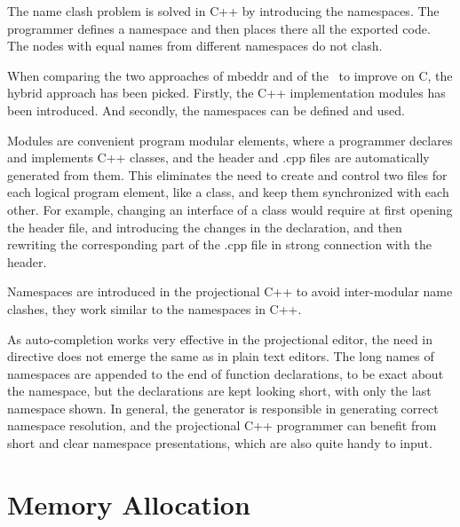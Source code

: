 The name clash problem is solved in C++ by introducing the namespaces. The programmer defines a namespace 
and then places there all the exported code. The nodes with equal names from different namespaces do not clash.

When comparing the two approaches of mbeddr and of the \cpppl\ to improve on C, the hybrid approach
has been picked. Firstly, the C++ implementation modules has been introduced. And secondly, the namespaces
can be defined and used.

Modules are convenient program modular elements, where a programmer declares and implements C++ classes,
and the header and .cpp files are automatically generated from them. This eliminates the need to 
create and control two files for each logical program element, like a class, and keep them synchronized with
each other. For example, changing an interface of a class would require at first opening the header file, 
and introducing the changes in the declaration, and then rewriting the corresponding part of the .cpp file 
in strong connection with the header.

Namespaces are introduced in the projectional C++ to avoid inter-modular name clashes, they work similar to 
the namespaces in C++.

As auto-completion works very effective in the projectional editor, the need in  directive does
not emerge the same as in plain text editors. The long names of namespaces are appended to the end of function 
declarations, to be exact about the namespace, but the declarations are kept looking short, with only 
the last namespace shown. In general, the generator is responsible in generating correct namespace 
resolution, and the projectional C++ programmer can benefit from short and clear namespace
presentations, which are also quite handy to input.

\section{Memory Allocation}







%
%



